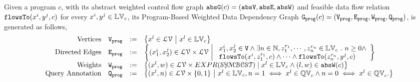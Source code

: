 \begin{defn}
  \label{def:prog_graph}
Given a program $c$, with its abstract weighted control flow graph $\mathtt{abs}{\mathtt{G}}(c) = (\mathtt{abs}{\mathtt{V}}, \mathtt{abs}{\mathtt{E}}, \mathtt{abs}{\mathtt{W}})$ and 
feasible data flow relation $\mathtt{flowsTo}(x^i, y^j, c)$ for every $x^i, y^j \in \mathbb{LV}_c$, its Program-Based Weighted Data Dependency Graph
$\mathtt{{G_{prog}}}(c) = (\mathtt{{V_{prog}}}, \mathtt{{E_{prog}}}, \mathtt{{W_{prog}}}, \mathtt{{Q_{prog}}})$,
is generated as follows,
{\footnotesize
\[
\begin{array}{rlcl}
\text{Vertices} &
\progV & := & \left\{ 
x^l \in \mathcal{LV} 
~ \middle\vert ~
x^l \in \lvar_{c}
\right\}
\\
\text{Directed Edges} &
\progE & := & 
\left\{ 
({x}_1^{i}, {x}_2^{j}) \in \mathcal{LV} \times \mathcal{LV}
~ \middle\vert ~
\begin{array}{l}
  {x}_1^{i}, {x}_2^{j} \in \vertxs
\land
  \exists n \in \mathbb{N}, z_1^{r_1}, \cdots, z_n^{r_n} \in \lvar_{{c}} \st 
  n \geq 0 \land
  \\
  \flowsto(x^i,  z_1^{r_1}, c) 
  \land \cdots \land \flowsto(z_n^{r_n}, y^j, c) 
\end{array}
\right\}
\\
\text{Weights} &
\progW & := &
\left\{ (x^l, w) \in  \mathcal{LV} \times EXPR(\constdom)
\mid
x^l \in \lvar_{{c}} \land (l, w) \in \absW(c)
\right\}
\\
\text{Query Annotation} &
\progF & := & 
\left\{(x^l, n)  \in  \mathcal{LV} \times \{0, 1\} 
~ \middle\vert ~
x^l \in \lvar_{c},
n = 1 \iff x^l \in \qvar_{c} \land n = 0 \iff  x^l \in \qvar_{c} .
\right\}
\end{array}
\] }
\end{defn}
